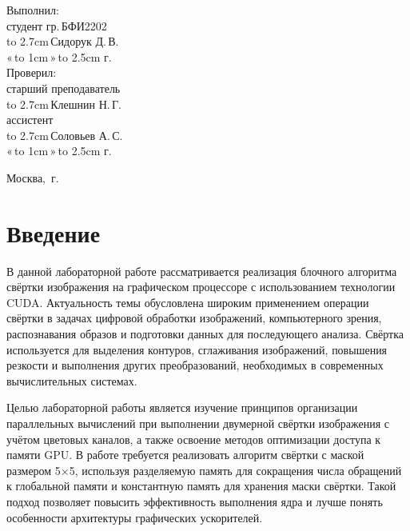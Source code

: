 \documentclass[14pt]{extarticle}
\makeatletter
\newcommand{\hrf}[1]{\hbox to #1{\hrulefill}} %
\newcounter{sectionc} %
\newcommand{\numbersections}{\renewcommand{\Hy@numberline}[1]{##1~}}
\newcommand{\nonumbersections}{\renewcommand{\Hy@numberline}[1]{}}
\let\oldsection\section
\renewcommand{\section}{\numbersections\oldsection}
\let\oldsectionc\sectionc
\renewcommand{\sectionc}{\nonumbersections\oldsectionc}
\renewcommand\tableofcontents{
	\pdfbookmark[sectionc]{\contentsname}{toc} %
	\sectionc*{\contentsname
		\@mkboth{\contentsname}{\contentsname}}
	\@starttoc{toc}
}
\makeatother
\begin{document}
\vfill %

\hfill %
\begin{minipage}{0.45\textwidth} %
	Выполнил:\\[2mm]
	студент гр.\,БФИ2202\\[2mm]
	\hrf{2.7cm}\,Сидорук Д.\,В.\\[2mm]
	«\,\hrf{1cm}\,»\,\hrf{2.5cm}\,\the\year{}\,г.\\[5mm]
	
	Проверил:\\[2mm]
	старший преподаватель\\[2mm]
	\hrf{2.7cm}\,Клешнин Н.\,Г.\\[2mm]
	ассистент\\[2mm]
	\hrf{2.7cm}\,Соловьев А.\,С.\\[2mm]
	«\,\hrf{1cm}\,»\,\hrf{2.5cm}\,\the\year{}\,г.
\end{minipage}%

\vfill

\centerline{Москва, \the\year{}\,г.} %
\thispagestyle{empty} %
\newpage %
\tableofcontents %
\newpage %

\section{Введение}

В данной лабораторной работе рассматривается реализация блочного алгоритма свёртки изображения на графическом процессоре с использованием технологии CUDA. Актуальность темы обусловлена широким применением операции свёртки в задачах цифровой обработки изображений, компьютерного зрения, распознавания образов и подготовки данных для последующего анализа. Свёртка используется для выделения контуров, сглаживания изображений, повышения резкости и выполнения других преобразований, необходимых в современных вычислительных системах.

Целью лабораторной работы является изучение принципов организации параллельных вычислений при выполнении двумерной свёртки изображения с учётом цветовых каналов, а также освоение методов оптимизации доступа к памяти GPU. В работе требуется реализовать алгоритм свёртки с маской размером 5×5, используя разделяемую память для сокращения числа обращений к глобальной памяти и константную память для хранения маски свёртки. Такой подход позволяет повысить эффективность выполнения ядра и лучше понять особенности архитектуры графических ускорителей.
\end{document}
